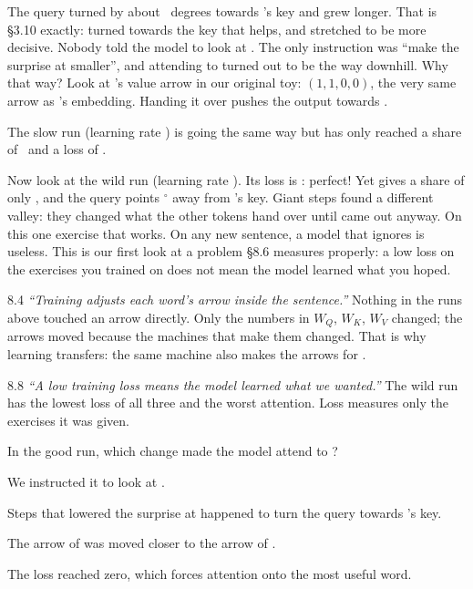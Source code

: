 The query turned by about \nEightTurned\ degrees towards 's key and grew longer. That is \S3.10 exactly:
turned towards the key that helps, and stretched to be more decisive. Nobody told the model to look at
. The only instruction was ``make the surprise at  smaller'', and attending to
 turned out to be the way downhill. Why that way? Look at 's value arrow in our
original toy: $(1,1,0,0)$, the very same arrow as 's embedding. Handing it over pushes the
output towards .

The slow run (learning rate \nEightTrainSlowLr) is going the same way but has only reached a share of
\nEightTrainSlowShareEnd\ and a loss of \nEightTrainSlowLossEnd.

Now look at the wild run (learning rate \nEightTrainWildLr). Its loss is \nEightTrainWildLossEnd: perfect!
Yet  gives  a share of only \nEightTrainWildShareEnd, and the query points
\nEightTrainWildAngEnd$^\circ$ away from 's key. Giant steps found a different valley: they changed
what the other tokens hand over until  came out anyway. On this one exercise that works. On any new
sentence, a model that ignores  is useless. This is our first look at a problem \S8.6 measures
properly: a low loss on the exercises you trained on does not mean the model learned what you hoped.

\begin{wrongidea}{8.4}
\emph{``Training adjusts each word's arrow inside the sentence.''} Nothing in the runs above touched an arrow
directly. Only the numbers in $W_Q$, $W_K$, $W_V$ changed; the arrows moved because the machines that make
them changed. That is why learning transfers: the same machine also makes the arrows for .
\end{wrongidea}

\begin{wrongidea}{8.8}
\emph{``A low training loss means the model learned what we wanted.''} The wild run has the lowest loss of
all three and the worst attention. Loss measures only the exercises it was given.
\end{wrongidea}

\begin{checkq}
In the good run, which change made the model attend to ?
\begin{options}
\item We instructed it to look at .
\item Steps that lowered the surprise at  happened to turn the query towards 's key.
\item The arrow of  was moved closer to the arrow of .
\item The loss reached zero, which forces attention onto the most useful word.
\end{options}
\end{checkq}

